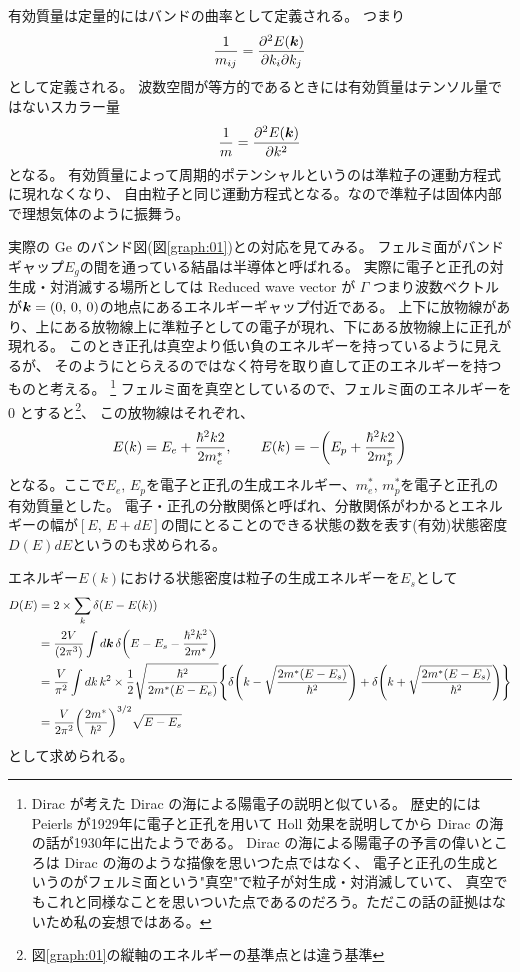 \documentclass[11pt,dvipdfmx,a4paper]{jsarticle}
\numberwithin{equation}{section}
\begin{document}
有効質量は定量的にはバンドの曲率として定義される。
つまり
\begin{equation}
	\frac{1}{m_{ij}} = \pdv[2]{E(\vb*{k})}{k_i}{k_j}
\end{equation}
として定義される。
波数空間が等方的であるときには有効質量はテンソル量ではないスカラー量
\begin{equation}
	\frac{1}{m} = \pdv[2]{E(\vb*{k})}{k}
\end{equation}
となる。
有効質量によって周期的ポテンシャルというのは準粒子の運動方程式に現れなくなり、
自由粒子と同じ運動方程式となる。なので準粒子は固体内部で理想気体のように振舞う。

実際の Ge のバンド図(図\ref{graph:01})との対応を見てみる。
フェルミ面がバンドギャップ\(E_g\)の間を通っている結晶は半導体と呼ばれる。
実際に電子と正孔の対生成・対消滅する場所としては Reduced wave vector が \(\Gamma\)
つまり波数ベクトルが\(\vb*{k}=(0,\,0,\,0)\)の地点にあるエネルギーギャップ付近である。
上下に放物線があり、上にある放物線上に準粒子としての電子が現れ、下にある放物線上に正孔が現れる。
このとき正孔は真空より低い負のエネルギーを持っているように見えるが、
そのようにとらえるのではなく符号を取り直して正のエネルギーを持つものと考える。
\footnote{Dirac が考えた Dirac の海による陽電子の説明と似ている。
歴史的には Peierls が1929年に電子と正孔を用いて Holl 効果を説明してから Dirac の海の話が1930年に出たようである。
Dirac の海による陽電子の予言の偉いところは Dirac の海のような描像を思いつた点ではなく、
電子と正孔の生成というのがフェルミ面という"真空"で粒子が対生成・対消滅していて、
真空でもこれと同様なことを思いついた点であるのだろう。ただこの話の証拠はないため私の妄想ではある。}
フェルミ面を真空としているので、フェルミ面のエネルギーを 0 とすると\footnote{図\ref{graph:01}の縦軸のエネルギーの基準点とは違う基準}、
この放物線はそれぞれ、
\begin{equation}
	E(k) = E_e + \frac{\hbar^2k2}{2m_e^*}, \qquad
	E(k) = -\qty(E_p + \frac{\hbar^2k2}{2m_p^*})
\end{equation}
となる。ここで\(E_e,\,E_p\)を電子と正孔の生成エネルギー、\(m_e^*,\,m_p^*\)を電子と正孔の有効質量とした。
電子・正孔の分散関係と呼ばれ、分散関係がわかるとエネルギーの幅が\([E,\,E+dE]\)の間にとることのできる状態の数を表す(有効)状態密度\(D(E)dE\)というのも求められる。

エネルギー\(E(k)\)における状態密度は粒子の生成エネルギーを\(E_s\)として
\begin{align}
	D(E)
	&= 2\times\sum_k \delta(E-E(k)) \notag\\
	&= \frac{2V}{(2\pi^3)}\int d\vb*{k}\, \delta\qty(E-E_s - \frac{\hbar^2k^2}{2m^*}) \notag\\
	&= \frac{V}{\pi^2} \int dk\, k^2\times \frac{1}{2}\sqrt{\frac{\hbar^2}{2m^*(E-E_e)}}\qty{\delta\qty(k-\sqrt{\frac{2m^*(E-E_s)}{\hbar^2}})+\delta\qty(k+\sqrt{\frac{2m^*(E-E_s)}{\hbar^2}})} \notag\\
	&= \frac{V}{2\pi^2}\qty(\frac{2m^*}{\hbar^2})^{3/2}\sqrt{E-E_s}
\end{align}
として求められる。
\end{document}
